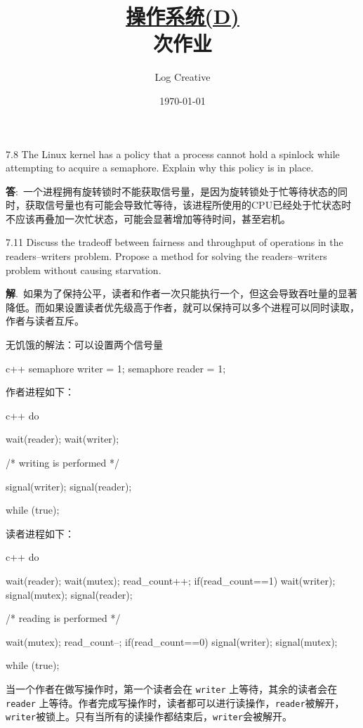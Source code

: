 \documentclass[12pt,a4paper]{article}
\newenvironment{problems}{\begin{list}{}{\renewcommand{\makelabel}[1]{\textbf{##1}\hfil}}}{\end{list}}
\providecommand{\ans}{\textbf{答}:~}
\providecommand{\sol}{\textbf{解}.~}
\begin{document}
\title{\normalsize \underline{操作系统(D)}\\ 次作业}
\author{Log Creative }
\date{\today}
\maketitle

\begin{problems}
    \item[7.8] The Linux kernel has a policy that a process cannot hold a spinlock while attempting to acquire a semaphore. Explain why this policy is in place.
    
    \ans 一个进程拥有旋转锁时不能获取信号量，是因为旋转锁处于忙等待状态的同时，获取信号量也有可能会导致忙等待，该进程所使用的CPU已经处于忙状态时不应该再叠加一次忙状态，可能会显著增加等待时间，甚至宕机。
    \item[7.11] Discuss the tradeoff between fairness and throughput of operations in the readers–writers problem. Propose a method for solving the readers–writers problem without causing starvation.
    
    \sol 如果为了保持公平，读者和作者一次只能执行一个，但这会导致吞吐量的显著降低。而如果设置读者优先级高于作者，就可以保持可以多个进程可以同时读取，作者与读者互斥。

    无饥饿的解法：可以设置两个信号量
    \begin{code}{c++}
        semaphore writer = 1;
        semaphore reader = 1;
    \end{code}
    作者进程如下：
    \begin{code}{c++}
    do{
        wait(reader);
        wait(writer);

        /* writing is performed */

        signal(writer);
        signal(reader);
    } while (true);
    \end{code}
    读者进程如下：
    \begin{code}{c++}
    do{
        wait(reader);
        wait(mutex);
        read_count++;
        if(read_count==1)
            wait(writer);
        signal(mutex);
        signal(reader);

        /* reading is performed */

        wait(mutex);
        read_count--;
        if(read_count==0)
            signal(writer);
        signal(mutex);
    } while (true);
    \end{code}
    
    当一个作者在做写操作时，第一个读者会在 \verb"writer" 上等待，其余的读者会在\verb"reader" 上等待。作者完成写操作时，读者都可以进行读操作，\verb"reader"被解开，\verb"writer"被锁上。只有当所有的读操作都结束后，\verb"writer"会被解开。


\end{problems}
\end{document}
